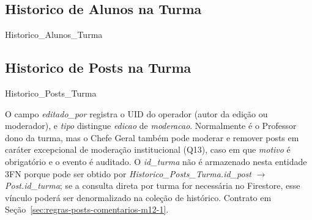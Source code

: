 \subsection{Historico de Alunos na Turma}
\begin{entidade}{Historico\_Alunos\_Turma}
\end{entidade}

\subsection{Historico de Posts na Turma}
\begin{entidade}{Historico\_Posts\_Turma}
\end{entidade}

\begin{explicacao}
O campo \textit{editado\_por} registra o UID do operador (autor da edição ou moderador), e \textit{tipo} distingue \textit{edicao} de \textit{moderacao}. Normalmente é o Professor dono da turma, mas o Chefe Geral também pode moderar e remover posts em caráter excepcional de moderação institucional (Q13), caso em que \textit{motivo} é obrigatório e o evento é auditado. O \textit{id\_turma} não é armazenado nesta entidade 3FN porque pode ser obtido por \textit{Historico\_Posts\_Turma.id\_post} $\rightarrow$ \textit{Post.id\_turma}; se a consulta direta por turma for necessária no Firestore, esse vínculo poderá ser denormalizado na coleção de histórico. Contrato em Seção~\ref{sec:regras-posts-comentarios-m12-1}.
\end{explicacao}

